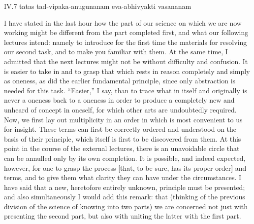 IV.7
tatas tad-vipaka-anugunanam eva-abhivyakti vasananam

I have stated in the last hour how
the part of our science on which we are now working
might be different from the part completed first,
and what our following lectures intend:
namely to introduce for the first time
the materials for resolving our second task,
and to make you familiar with them.
At the same time, I admitted that the next lectures
might not be without difficulty and confusion.
It is easier to take in and to grasp
that which rests in reason completely and simply as oneness,
as did the earlier fundamental principle,
since only abstraction is needed for this task.
“Easier,” I say, than to trace what
in itself and originally is never a oneness
back to a oneness in order to produce
a completely new and unheard of concept in oneself,
for which other arts are undoubtedly required.
Now, we first lay out multiplicity in an order
in which is most convenient to us for insight.
These terms can first be correctly
ordered and understood on the basis of their principle,
which itself is first to be discovered from them.
At this point in the course of the external lectures,
there is an unavoidable circle that can be annulled
only by its own completion.
It is possible, and indeed expected, however,
for one to grasp the process
[that, to be sure, has its proper order]
and terms, and to give them what clarity
they can have under the circumstances.
I have said that a new, heretofore entirely unknown,
principle must be presented;
and also simultaneously I would add this remark: that
(thinking of the previous division
of the science of knowing into two parts)
we are concerned not just with presenting the second part,
but also with uniting the latter with the first part.

